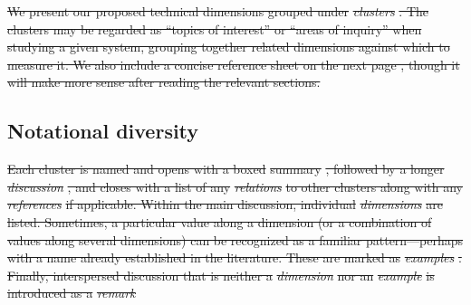\documentclass[english,submission]{programming}
\providecommand{\DIFadd}[1]{{\protect\color{blue}\uwave{#1}}} %
\providecommand{\DIFdel}[1]{{\protect\color{red}\sout{#1}}}                      %
\providecommand{\DIFaddbegin}{} %
\providecommand{\DIFaddend}{} %
\providecommand{\DIFdelbegin}{} %
\providecommand{\DIFdelend}{} %
\begin{document}
\DIFdelbegin \DIFdel{We present our proposed technical dimensions grouped under
}\emph{\DIFdel{clusters}}%
\DIFdel{. The clusters may be regarded as ``topics of interest'' or ``areas of inquiry'' when studying a given system, grouping together
related dimensions against which to measure it. We also include a concise reference sheet on the next page , though it will make more sense
after reading the relevant sections.
}\DIFdelend \DIFaddbegin \hypertarget{notational-diversity}{%
\subsection{Notational diversity}\label{notational-diversity}}
\DIFaddend 

\DIFdelbegin \DIFdel{Each cluster is named and opens with a boxed }%
\DIFdel{summary}%
\DIFdel{, followed by
a longer }\emph{\DIFdel{discussion}}%
\DIFdel{, and closes with a list of
  any
}\emph{\DIFdel{relations}} %
\DIFdel{to other clusters along with any }\emph{\DIFdel{references}} %
\DIFdel{if
applicable.
Within the main discussion, individual }\emph{\DIFdel{dimensions}} %
\DIFdel{are
listed. Sometimes, a particular value along a dimension (or a
combination of values along several dimensions) can be recognized as a
familiar pattern---perhaps with a name already established in the
literature.
These are marked as }\emph{\DIFdel{examples}}%
\DIFdel{. Finally, interspersed
discussion that is neither a }\emph{\DIFdel{dimension}} %
\DIFdel{nor an }\emph{\DIFdel{example}} %
\DIFdel{is
introduced as a
}\emph{\DIFdel{remark}}%
\DIFdelend \DIFaddbegin \DIFadd{Questions:
}
\end{document}
